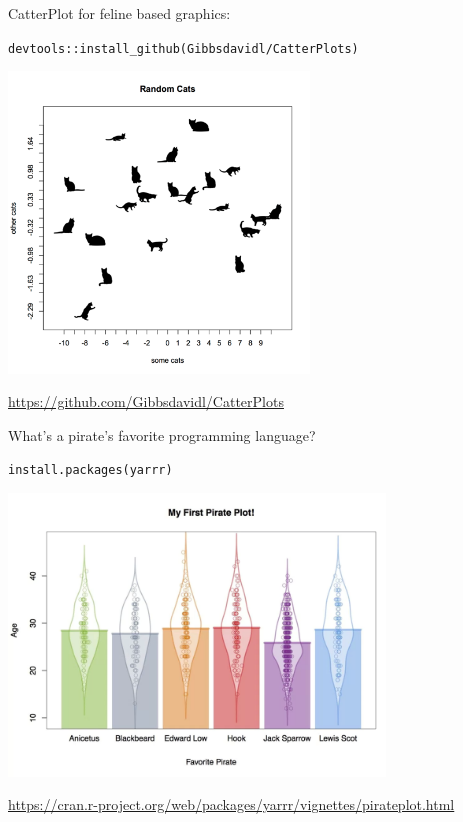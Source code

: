 \documentclass[ignorenonframetext,]{beamer}
\begin{document}
\begin{frame}[fragile]{CatterPlot for feline based graphics:}
\protect\hypertarget{catterplot-for-feline-based-graphics}{}

\texttt{devtools::install\_github(Gibbsdavidl/CatterPlots)}

\includegraphics[width=0.6\textwidth,height=\textheight]{../external/images/funR_1_catterplotter.png}

\url{https://github.com/Gibbsdavidl/CatterPlots}

\end{frame}

\begin{frame}[fragile]{What's a pirate's favorite programming language?}
\protect\hypertarget{whats-a-pirates-favorite-programming-language}{}

\texttt{install.packages(\textquotesingle{}yarrr\textquotesingle{})}

\includegraphics[width=0.75\textwidth,height=\textheight]{../external/images/funR_2_pirate.png}

\url{https://cran.r-project.org/web/packages/yarrr/vignettes/pirateplot.html}

\end{frame}
\end{document}
